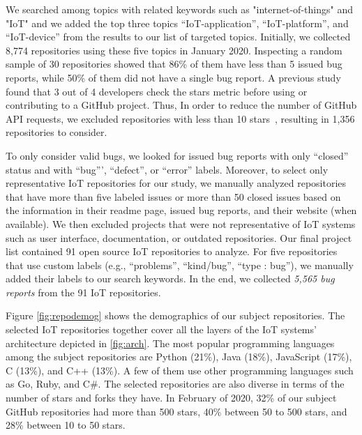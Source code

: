  We searched among topics with related keywords such as "internet-of-things" and "IoT" and we added the top three topics ``IoT-application'', ``IoT-platform'', and ``IoT-device'' from the results to our list of targeted topics. Initially, we collected 8,774 repositories using these five topics in January 2020. Inspecting a random sample of 30 repositories showed that 86\% of them have less than 5 issued bug reports, while 50\% of them did not have a single bug report. A previous study~\cite{borges2018s} found that 3 out of 4 developers check the stars metric before using or contributing to a GitHub project. 
Thus, In order to reduce the number of GitHub API requests, we excluded repositories with less than 10 stars~\cite{borges2018s}, resulting in 1,356 repositories to consider.

To only consider valid bugs, we looked for issued bug reports with only ``closed'' status and with ``bug''', ``defect'', or ``error'' labels.  Moreover, to select only representative IoT repositories for our study, we manually analyzed repositories that have more than five labeled issues or more than 50 closed issues based on the information in their readme page, issued bug reports, and their website (when available). We then excluded projects that were not representative of IoT systems such as user interface, documentation, or outdated repositories. Our final project list contained 91 open source IoT repositories to analyze. For five repositories that use custom labels (e.g., ``problems'', ``kind/bug'', ``type : bug''), we manually added their labels to our search keywords. In the end, we collected \emph{5,565 bug reports} from the 91 IoT repositories.

Figure \autoref{fig:repodemog} shows the demographics of our subject repositories. The selected IoT repositories together cover all the layers of the IoT systems' architecture depicted in \autoref{fig:arch}. The most popular programming languages among the subject repositories are Python (21\%), Java (18\%), JavaScript (17\%), C (13\%), and C++ (13\%). A few of them use other programming languages such as Go, Ruby, and C\#. The selected repositories are also diverse in terms of the number of stars and forks they have. In February of 2020, 32\% of our subject GitHub repositories had more than 500 stars, 40\% between 50 to 500 stars, and 28\% between 10 to 50 stars.


